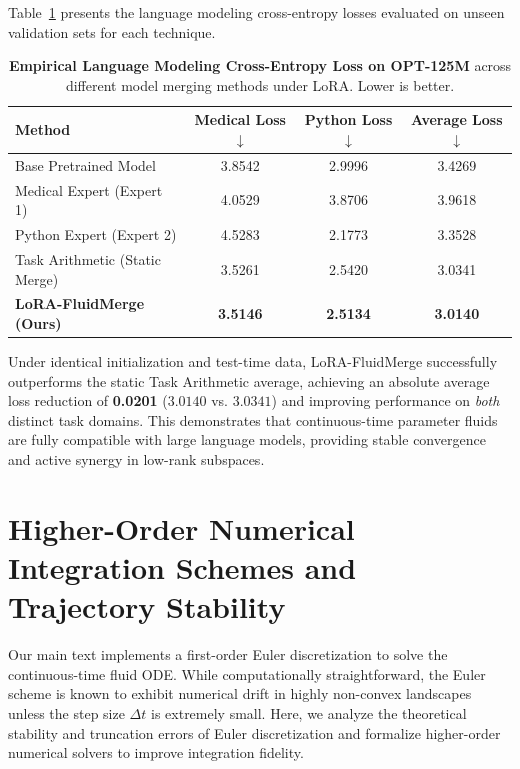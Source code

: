 \documentclass{article}
\theoremstyle{plain}
\theoremstyle{definition}
\theoremstyle{remark}
\begin{document}
Table~\ref{tab:llm_lora_results} presents the language modeling cross-entropy losses evaluated on unseen validation sets for each technique.
\begin{table}[h]
\caption{\textbf{Empirical Language Modeling Cross-Entropy Loss on OPT-125M} across different model merging methods under LoRA. Lower is better.}
\label{tab:llm_lora_results}
\vskip 0.15in
\begin{center}
\begin{small}
\begin{sc}
\begin{tabular}{lccc}
\toprule
Method & Medical Loss $\downarrow$ & Python Loss $\downarrow$ & Average Loss $\downarrow$ \\
\midrule
Base Pretrained Model & 3.8542 & 2.9996 & 3.4269 \\
Medical Expert (Expert 1) & 4.0529 & 3.8706 & 3.9618 \\
Python Expert (Expert 2) & 4.5283 & 2.1773 & 3.3528 \\
Task Arithmetic (Static Merge) & 3.5261 & 2.5420 & 3.0341 \\
\textbf{LoRA-FluidMerge (Ours)} & \textbf{3.5146} & \textbf{2.5134} & \textbf{3.0140} \\
\bottomrule
\end{tabular}
\end{sc}
\end{small}
\end{center}
\end{table}

Under identical initialization and test-time data, LoRA-FluidMerge successfully outperforms the static Task Arithmetic average, achieving an absolute average loss reduction of \textbf{0.0201} ($3.0140$ vs. $3.0341$) and improving performance on \textit{both} distinct task domains. This demonstrates that continuous-time parameter fluids are fully compatible with large language models, providing stable convergence and active synergy in low-rank subspaces.

\newpage
\section{Higher-Order Numerical Integration Schemes and Trajectory Stability}
\label{app:numerical_stability}
Our main text implements a first-order Euler discretization to solve the continuous-time fluid ODE. While computationally straightforward, the Euler scheme is known to exhibit numerical drift in highly non-convex landscapes unless the step size $\Delta t$ is extremely small. Here, we analyze the theoretical stability and truncation errors of Euler discretization and formalize higher-order numerical solvers to improve integration fidelity.
\end{document}
